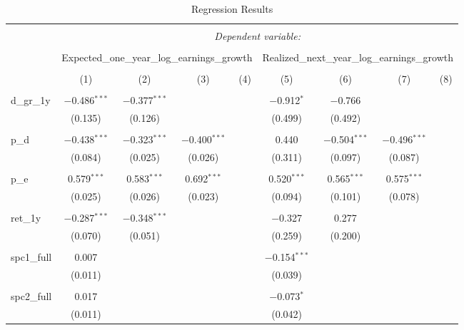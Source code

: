 
\begin{table}[!htbp] \centering 
  \caption{Regression Results} 
  \label{} 
\begin{tabular}{@{\extracolsep{5pt}}lcccccccc} 
\\[-1.8ex]\hline 
\hline \\[-1.8ex] 
 & \multicolumn{8}{c}{\textit{Dependent variable:}} \\ 
\cline{2-9} 
\\[-1.8ex] & \multicolumn{4}{c}{Expected\_one\_year\_log\_earnings\_growth} & \multicolumn{4}{c}{Realized\_next\_year\_log\_earnings\_growth} \\ 
\\[-1.8ex] & (1) & (2) & (3) & (4) & (5) & (6) & (7) & (8)\\ 
\hline \\[-1.8ex] 
 d\_gr\_1y & $-$0.486$^{***}$ & $-$0.377$^{***}$ &  &  & $-$0.912$^{*}$ & $-$0.766 &  &  \\ 
  & (0.135) & (0.126) &  &  & (0.499) & (0.492) &  &  \\ 
  & & & & & & & & \\ 
 p\_d & $-$0.438$^{***}$ & $-$0.323$^{***}$ & $-$0.400$^{***}$ &  & 0.440 & $-$0.504$^{***}$ & $-$0.496$^{***}$ &  \\ 
  & (0.084) & (0.025) & (0.026) &  & (0.311) & (0.097) & (0.087) &  \\ 
  & & & & & & & & \\ 
 p\_e & 0.579$^{***}$ & 0.583$^{***}$ & 0.692$^{***}$ &  & 0.520$^{***}$ & 0.565$^{***}$ & 0.575$^{***}$ &  \\ 
  & (0.025) & (0.026) & (0.023) &  & (0.094) & (0.101) & (0.078) &  \\ 
  & & & & & & & & \\ 
 ret\_1y & $-$0.287$^{***}$ & $-$0.348$^{***}$ &  &  & $-$0.327 & 0.277 &  &  \\ 
  & (0.070) & (0.051) &  &  & (0.259) & (0.200) &  &  \\ 
  & & & & & & & & \\ 
 spc1\_full & 0.007 &  &  &  & $-$0.154$^{***}$ &  &  &  \\ 
  & (0.011) &  &  &  & (0.039) &  &  &  \\ 
  & & & & & & & & \\ 
 spc2\_full & 0.017 &  &  &  & $-$0.073$^{*}$ &  &  &  \\ 
  & (0.011) &  &  &  & (0.042) &  &  &  \\ 

\end{tabular}
\end{table}
